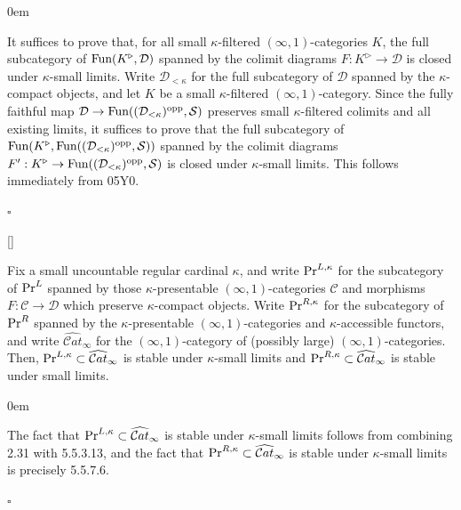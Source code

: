 \documentclass[10pt]{article}
\newcommand{\mS}{\mathcal S}
\newcommand{\C}{\mathcal C}
\newcommand{\cD}{\mathcal{D}}
\renewcommand{\qed}{\hfill$\square$}
\renewenvironment{proof}{\begin{addmargin}[1em]{0em}\begin{newproof}}{\end{newproof}\end{addmargin}\qed}
\theoremstyle{witharg}
\theoremstyle{witharg}
\theoremstyle{witharg2}
\begin{document}
\begin{proof}

    It suffices to prove that, for all small $\kappa$-filtered $(\infty,1)$-categories $K$, the full subcategory of $\textnormal{Fun}(K^\triangleright,\cD)$ spanned by the colimit diagrams $F:K^\triangleright\rightarrow \cD$ is closed under $\kappa$-small limits. Write $\cD_{<\kappa}$ for the full subcategory of $\cD$ spanned by the $\kappa$-compact objects, and let $K$ be a small $\kappa$-filtered $(\infty,1)$-category. Since the fully faithful map $\cD\rightarrow \textnormal{Fun}((\cD_{<\kappa})^{\textnormal{opp}},\mS)$ preserves small $\kappa$-filtered colimits and all existing limits, it suffices to prove that the full subcategory of $\textnormal{Fun}(K^\triangleright,\textnormal{Fun}((\cD_{<\kappa})^{\textnormal{opp}},\mS))$ spanned by the colimit diagrams $F^\prime:K^\triangleright\rightarrow \textnormal{Fun}((\cD_{<\kappa})^{\textnormal{opp}},\mS)$ is closed under $\kappa$-small limits. This follows immediately from  05Y0.
    
\end{proof}

\begin{lemma}{}[]\label{kappa small limits in PrL,kappa}

    Fix a small uncountable regular cardinal $\kappa$, and write $\textnormal{Pr}^{L,\kappa}$ for the subcategory of $\textnormal{Pr}^{L}$ spanned by those $\kappa$-presentable $(\infty,1)$-categories $\C$ and morphisms $F:\C\rightarrow \cD$ which preserve $\kappa$-compact objects. Write $\textnormal{Pr}^{R,\kappa}$ for the subcategory of $\textnormal{Pr}^{R}$ spanned by the $\kappa$-presentable $(\infty,1)$-categories and $\kappa$-accessible functors, and write $\widehat{\C at}_\infty$ for the $(\infty,1)$-category of (possibly large) $(\infty,1)$-categories. Then, $\textnormal{Pr}^{L,\kappa}\subset \widehat{\C at}_\infty$ is stable under $\kappa$-small limits and $\textnormal{Pr}^{R,\kappa}\subset \widehat{\C at}_\infty$ is stable under small limits. 
    
\end{lemma}

\begin{proof}

    The fact that $\textnormal{Pr}^{L,\kappa}\subset \widehat{\C at}_\infty$ is stable under $\kappa$-small limits follows from combining  2.31 with  5.5.3.13, and the fact that $\textnormal{Pr}^{R,\kappa}\subset \widehat{\C at}_\infty$ is stable under $\kappa$-small limits is precisely  5.5.7.6. 
    
\end{proof}
\end{document}
